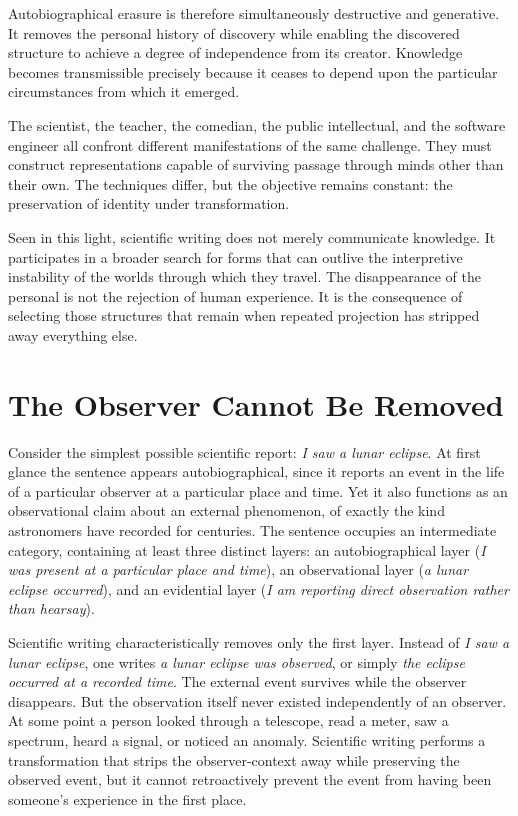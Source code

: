 \documentclass[11pt]{article}
\theoremstyle{plain}
\begin{document}
Autobiographical erasure is therefore simultaneously destructive and generative. It removes the personal history of discovery while enabling the discovered structure to achieve a degree of independence from its creator. Knowledge becomes transmissible precisely because it ceases to depend upon the particular circumstances from which it emerged.

The scientist, the teacher, the comedian, the public intellectual, and the software engineer all confront different manifestations of the same challenge. They must construct representations capable of surviving passage through minds other than their own. The techniques differ, but the objective remains constant: the preservation of identity under transformation.

Seen in this light, scientific writing does not merely communicate knowledge. It participates in a broader search for forms that can outlive the interpretive instability of the worlds through which they travel. The disappearance of the personal is not the rejection of human experience. It is the consequence of selecting those structures that remain when repeated projection has stripped away everything else.

\section{The Observer Cannot Be Removed}

Consider the simplest possible scientific report: \emph{I saw a lunar eclipse}. At first glance the sentence appears autobiographical, since it reports an event in the life of a particular observer at a particular place and time. Yet it also functions as an observational claim about an external phenomenon, of exactly the kind astronomers have recorded for centuries. The sentence occupies an intermediate category, containing at least three distinct layers: an autobiographical layer (\emph{I was present at a particular place and time}), an observational layer (\emph{a lunar eclipse occurred}), and an evidential layer (\emph{I am reporting direct observation rather than hearsay}).

Scientific writing characteristically removes only the first layer. Instead of \emph{I saw a lunar eclipse}, one writes \emph{a lunar eclipse was observed}, or simply \emph{the eclipse occurred at a recorded time}. The external event survives while the observer disappears. But the observation itself never existed independently of an observer. At some point a person looked through a telescope, read a meter, saw a spectrum, heard a signal, or noticed an anomaly. Scientific writing performs a transformation that strips the observer-context away while preserving the observed event, but it cannot retroactively prevent the event from having been someone's experience in the first place.
\end{document}
